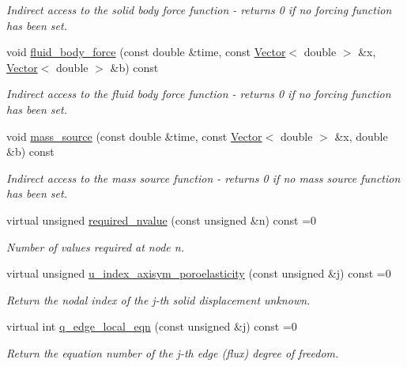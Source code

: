 \begin{DoxyCompactItemize}
\begin{DoxyCompactList}\small\item\em Indirect access to the solid body force function -\/ returns 0 if no forcing function has been set. \end{DoxyCompactList}\item 
void \hyperlink{classoomph_1_1AxisymmetricPoroelasticityEquations_ad1eeb8bb77f7b792cb26c66e3f824d73}{fluid\+\_\+body\+\_\+force} (const double \&time, const \hyperlink{classoomph_1_1Vector}{Vector}$<$ double $>$ \&x, \hyperlink{classoomph_1_1Vector}{Vector}$<$ double $>$ \&b) const
\begin{DoxyCompactList}\small\item\em Indirect access to the fluid body force function -\/ returns 0 if no forcing function has been set. \end{DoxyCompactList}\item 
void \hyperlink{classoomph_1_1AxisymmetricPoroelasticityEquations_a0a863fa42e1ee95ba85bec4bd1bda7a5}{mass\+\_\+source} (const double \&time, const \hyperlink{classoomph_1_1Vector}{Vector}$<$ double $>$ \&x, double \&b) const
\begin{DoxyCompactList}\small\item\em Indirect access to the mass source function -\/ returns 0 if no mass source function has been set. \end{DoxyCompactList}\item 
virtual unsigned \hyperlink{classoomph_1_1AxisymmetricPoroelasticityEquations_a926fed18368bf5e4f4f52c6817c007b5}{required\+\_\+nvalue} (const unsigned \&n) const =0
\begin{DoxyCompactList}\small\item\em Number of values required at node n. \end{DoxyCompactList}\item 
virtual unsigned \hyperlink{classoomph_1_1AxisymmetricPoroelasticityEquations_a258196c8f66ba5eec329565fa66dfcc7}{u\+\_\+index\+\_\+axisym\+\_\+poroelasticity} (const unsigned \&j) const =0
\begin{DoxyCompactList}\small\item\em Return the nodal index of the j-\/th solid displacement unknown. \end{DoxyCompactList}\item 
virtual int \hyperlink{classoomph_1_1AxisymmetricPoroelasticityEquations_a2cc9733c35e65c880246b3b072abb263}{q\+\_\+edge\+\_\+local\+\_\+eqn} (const unsigned \&j) const =0
\begin{DoxyCompactList}\small\item\em Return the equation number of the j-\/th edge (flux) degree of freedom. \end{DoxyCompactList}\item 

\end{DoxyCompactItemize}
